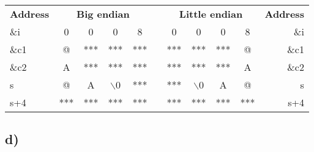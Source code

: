 \documentclass[a4paper,11pt]{report}
\begin{document}
\begin{table}[h]
\centering
\begin{tabular}{lcccclccccr}
\textbf{Address}          & \multicolumn{4}{c}{\textbf{Big endian}}                                                                   &                       & \multicolumn{4}{c}{\textbf{Little endian}}                                                                & \multicolumn{1}{l}{\textbf{Address}} \\ \cline{2-5} \cline{7-10}
\multicolumn{1}{l|}{\&i}  & \multicolumn{1}{c|}{0}   & \multicolumn{1}{c|}{0}   & \multicolumn{1}{c|}{0}   & \multicolumn{1}{c|}{8}   & \multicolumn{1}{l|}{} & \multicolumn{1}{c|}{0}   & \multicolumn{1}{c|}{0}   & \multicolumn{1}{c|}{0}   & \multicolumn{1}{c|}{8}   & \&i                                  \\ \cline{2-5} \cline{7-10}
\multicolumn{1}{l|}{\&c1} & \multicolumn{1}{c|}{@}   & \multicolumn{1}{c|}{***} & \multicolumn{1}{c|}{***} & \multicolumn{1}{c|}{***} & \multicolumn{1}{l|}{} & \multicolumn{1}{c|}{***} & \multicolumn{1}{c|}{***} & \multicolumn{1}{c|}{***} & \multicolumn{1}{c|}{@}   & \&c1                                 \\ \cline{2-5} \cline{7-10}
\multicolumn{1}{l|}{\&c2} & \multicolumn{1}{c|}{A}   & \multicolumn{1}{c|}{***} & \multicolumn{1}{c|}{***} & \multicolumn{1}{c|}{***} & \multicolumn{1}{l|}{} & \multicolumn{1}{c|}{***} & \multicolumn{1}{c|}{***} & \multicolumn{1}{c|}{***} & \multicolumn{1}{c|}{A}   & \&c2                                 \\ \cline{2-5} \cline{7-10}
  \multicolumn{1}{l|}{s}    & \multicolumn{1}{c|}{@}   & \multicolumn{1}{c|}{A}   & \multicolumn{1}{c|}{$\backslash$0}  & \multicolumn{1}{c|}{***} & \multicolumn{1}{l|}{} & \multicolumn{1}{c|}{***} & \multicolumn{1}{c|}{$\backslash$0}   & \multicolumn{1}{c|}{A}   & \multicolumn{1}{c|}{@}   & s                                    \\ \cline{2-5} \cline{7-10}
\multicolumn{1}{l|}{s+4}  & \multicolumn{1}{c|}{***} & \multicolumn{1}{c|}{***} & \multicolumn{1}{c|}{***} & \multicolumn{1}{c|}{***} & \multicolumn{1}{l|}{} & \multicolumn{1}{c|}{***} & \multicolumn{1}{c|}{***} & \multicolumn{1}{c|}{***} & \multicolumn{1}{c|}{***} & s+4                                  \\ \cline{2-5} \cline{7-10}
\end{tabular}
\end{table}

\subsection*{d)}
\end{document}
